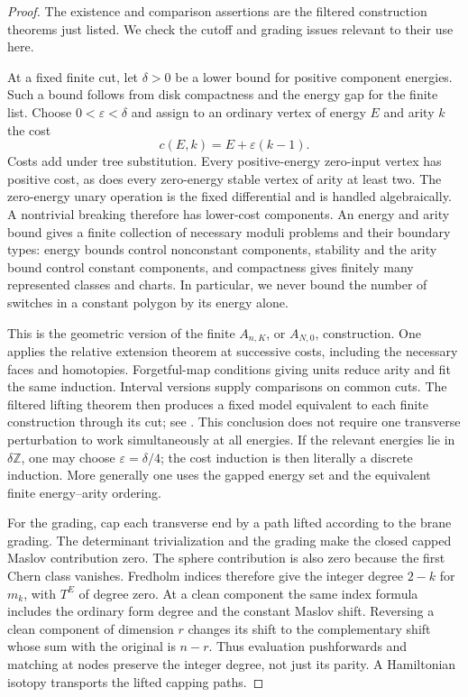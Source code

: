 \documentclass[11pt]{article}
\numberwithin{equation}{section}
\theoremstyle{definition}
\theoremstyle{remark}
\newcommand{\Z}{\mathbb Z}
\begin{document}
\begin{proof}
The existence and comparison assertions are the filtered construction
theorems just listed.  We check the cutoff and grading issues relevant to
their use here.

At a fixed finite cut, let $\delta>0$ be a lower bound for positive
component energies.  Such a bound follows from disk compactness and the
energy gap for the finite list.  Choose $0<\varepsilon<\delta$ and assign
to an ordinary vertex of energy $E$ and arity $k$ the cost
\begin{equation}
 \label{eq:floer-cost}
 c(E,k)=E+\varepsilon(k-1).
\end{equation}
Costs add under tree substitution.  Every positive-energy zero-input
vertex has positive cost, as does every zero-energy stable vertex of
arity at least two.  The zero-energy unary operation is the fixed
differential and is handled algebraically.  A nontrivial breaking
therefore has lower-cost components.  An energy and arity bound gives
a finite collection of necessary moduli problems and their boundary
types: energy bounds control nonconstant components, stability and the
arity bound control constant components, and compactness gives finitely
many represented classes and charts.  In particular, we never bound the
number of switches in a constant polygon by its energy alone.

This is the geometric version of the finite $A_{n,K}$, or $A_{N,0}$,
construction.  One applies the relative extension theorem at successive
costs, including the necessary faces and homotopies.  Forgetful-map
conditions giving units reduce arity and fit the same induction.
Interval versions supply comparisons on common cuts.  The filtered
lifting theorem then produces a fixed model equivalent to each finite
construction through its cut; see
\cite[Sections~7--11]{Floer:AJ}.  This conclusion does not require one
transverse perturbation to work simultaneously at all energies.  If
the relevant energies lie in $\delta\Z$, one may choose
$\varepsilon=\delta/4$; the cost induction is then literally a discrete
induction.  More generally one uses the gapped energy set and the
equivalent finite energy--arity ordering.

For the grading, cap each transverse end by a path lifted according to
the brane grading.  The determinant trivialization and the grading make
the closed capped Maslov contribution zero.  The sphere contribution is
also zero because the first Chern class vanishes.  Fredholm indices
therefore give the integer degree $2-k$ for $m_k$, with $T^E$ of degree
zero.  At a clean component the same index formula includes the ordinary
form degree and the constant Maslov shift.  Reversing a clean component
of dimension $r$ changes its shift to the complementary shift whose sum
with the original is $n-r$.  Thus evaluation pushforwards and matching
at nodes preserve the integer degree, not just its parity.  A
Hamiltonian isotopy transports the lifted capping paths.


\end{proof}
\end{document}
